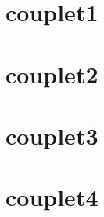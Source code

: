 \songbooksongstruct

\newpage

\begin{multicols}{2}
	\xxxlyrics
\end{multicols}

\newpage

\section*{couplet1}

\section*{couplet2}

\section*{couplet3}

\section*{couplet4}
